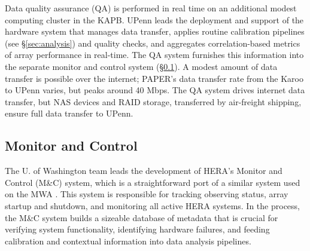 \documentclass[ars]{/Users/daviddeboer1/Documents/Papers/Copernicus_LaTeX_Package_v_2_7/copernicus}
\begin{document}
Data quality assurance (QA) is performed in real time on an additional modest 
computing cluster in the
KAPB.  UPenn leads the deployment and support of the hardware system that
manages data transfer, applies routine calibration pipelines (see \S\ref{sec:analysis}) and quality
checks, and aggregates correlation-based metrics of array performance in real-time.  The QA system
furnishes this information into the separate monitor and control system (\S\ref{sec:monitor}).
A modest amount of data transfer is possible over the internet; PAPER's data transfer rate from the Karoo
to UPenn varies, but peaks around 40 Mbps.  The QA system drives internet data transfer, but
NAS devices and RAID storage, transferred by air-freight shipping, ensure full data transfer to UPenn.




\subsection{Monitor and Control}
\label{sec:monitor}

The U. of Washington team leads the development of HERA's Monitor and Control (M\&C) system,
which is a straightforward port of a similar system used on the MWA .
This system is
responsible for tracking observing status, array startup and shutdown, and
monitoring all active HERA systems. In the process, the M\&C system builds a sizeable database of 
metadata that is crucial for verifying system functionality, identifying hardware failures, and feeding
calibration and contextual information into data analysis pipelines.  
\end{document}
